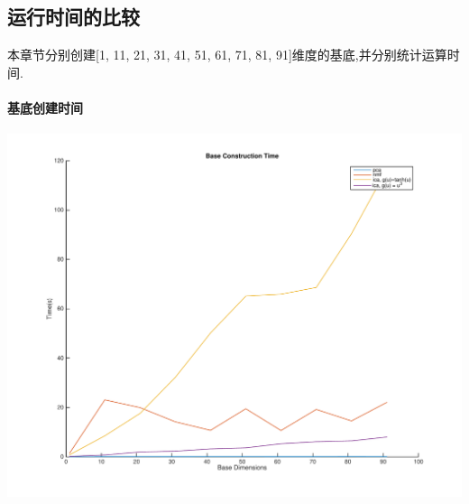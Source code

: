 \subsection{运行时间的比较}
\label{sec:pni_cal_time}
本章节分别创建[1, 11, 21, 31, 41, 51, 61, 71, 81, 91]维度的基底,并分别统计运算时间.
\paragraph{基底创建时间}
\begin{center}
\begin{minipage}[t]{\linewidth}
\center
{
\includegraphics[width=\MyFactor\textwidth]{Img/pni_baseconstr} 
\label{fig:ica_base}
}
\end{minipage}
\medskip
\end{center}

